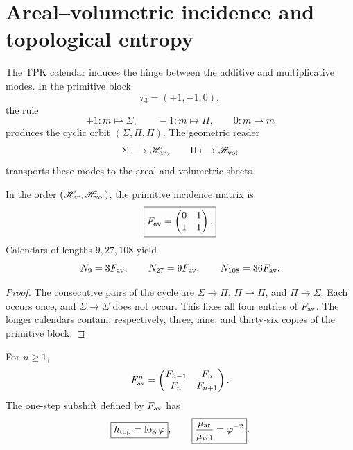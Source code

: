 \section{Areal--volumetric incidence and topological entropy}

The TPK calendar induces the hinge between the additive and
multiplicative modes. In the primitive block
\[
 \tau_3=(+1,-1,0),
\]
the rule
\[
 +1:m\mapsto\Sigma,
 \qquad
 -1:m\mapsto\Pi,
 \qquad
 0:m\mapsto m
\]
produces the cyclic orbit \((\Sigma,\Pi,\Pi)\). The geometric reader
\[
 \Sigma\longmapsto\mathscr H_{\rm ar},
 \qquad
 \Pi\longmapsto\mathscr H_{\rm vol}
\]
transports these modes to the areal and volumetric sheets.

\begin{theorem}
\label{thm:incidencia-hojas-anexo}
In the order \((\mathscr H_{\rm ar},\mathscr H_{\rm vol})\), the
primitive incidence matrix is
\begin{equation}
 \boxed{
 F_{\rm av}=
 \begin{pmatrix}0&1\\1&1\end{pmatrix}.}
 \label{eq:fav-anexo-informacion}
\end{equation}
Calendars of lengths \(9,27,108\) yield
\[
 N_9=3F_{\rm av},
 \qquad N_{27}=9F_{\rm av},
 \qquad N_{108}=36F_{\rm av}.
\]
\end{theorem}

\begin{proof}
The consecutive pairs of the cycle are
\(\Sigma\to\Pi\), \(\Pi\to\Pi\), and \(\Pi\to\Sigma\). Each occurs
once, and \(\Sigma\to\Sigma\) does not occur. This fixes all four entries of
\(F_{\rm av}\). The longer calendars contain, respectively, three,
nine, and thirty-six copies of the primitive block.
\end{proof}

\begin{theorem}
\label{thm:fibonacci-parry-anexo}
For \(n\geq1\),
\begin{equation}
 F_{\rm av}^{n}
 =\begin{pmatrix}F_{n-1}&F_n\\F_n&F_{n+1}\end{pmatrix}.
 \label{eq:potencias-fav-anexo}
\end{equation}
The one-step subshift defined by \(F_{\rm av}\) has
\begin{equation}
 \boxed{h_{\rm top}=\log\varphi},
 \qquad
 \boxed{\frac{\mu_{\rm ar}}{\mu_{\rm vol}}=\varphi^{-2}}.
 \label{eq:entropia-parry-hojas-anexo}
\end{equation}
\end{theorem}

